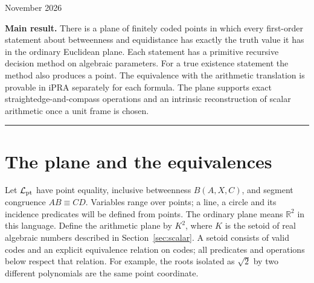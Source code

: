 \documentclass[11pt,letterpaper]{article}
\theoremstyle{definition}
\begin{document}
\thispagestyle{empty}
\hfill
{\small{} November 2026}\par
\vspace{13pt}
\par
\vspace{2pt}\par
\vspace{11pt}
\noindent\textbf{Main result.} There is a plane of finitely coded points in which
every first-order statement about betweenness and equidistance has exactly
the truth value it has in the ordinary Euclidean plane. Each statement has
a primitive recursive decision method on algebraic parameters. For a true
existence statement the method also produces a point. The equivalence with
the arithmetic translation is provable in iPRA separately for each formula.
The plane supports exact straightedge-and-compass operations and an intrinsic
reconstruction of scalar arithmetic once a unit frame is chosen.
\par\vspace{8pt}\noindent\textcolor{accent}{\rule{\linewidth}{0.8pt}}
\section{The plane and the equivalences}
\label{sec:scope}
Let $\mathcal L_{\rm pt}$ have point equality, inclusive betweenness
$B(A,X,C)$, and segment congruence $AB\equiv CD$. Variables range over
points; a line, a circle and its incidence predicates will be defined
from points. The ordinary plane means $\mathbb R^2$ in this language.
Define the arithmetic plane by $K^2$, where $K$ is the setoid of
real algebraic numbers described in Section~\ref{sec:scalar}.
A setoid consists of valid codes and an explicit equivalence relation
on codes; all predicates and operations below respect that relation.
For example, the roots isolated as $\sqrt{2}$ by two different
polynomials are the same point coordinate.
\end{document}
